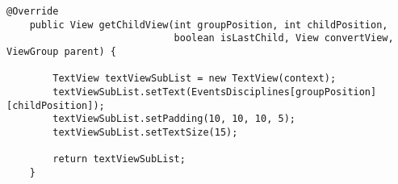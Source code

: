 \begin{lstlisting}[style=custom_JAVA]
@Override
    public View getChildView(int groupPosition, int childPosition,
                             boolean isLastChild, View convertView, ViewGroup parent) {

        TextView textViewSubList = new TextView(context);
        textViewSubList.setText(EventsDisciplines[groupPosition][childPosition]);
        textViewSubList.setPadding(10, 10, 10, 5);
        textViewSubList.setTextSize(15);

        return textViewSubList;
    }
\end{lstlisting}